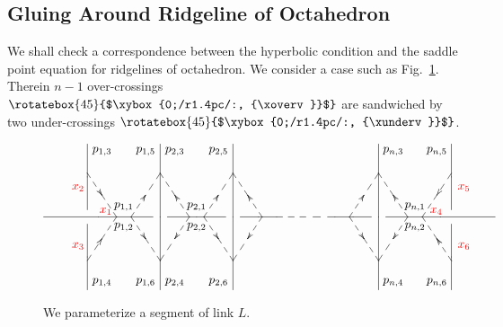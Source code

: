 \documentclass[12pt]{article}
\numberwithin{equation}{section}
\begin{document}
\subsection{Gluing Around Ridgeline of Octahedron}

We shall check  a correspondence between the hyperbolic condition and the
saddle point equation for ridgelines of octahedron.
We consider a case such as Fig.~\ref{fig:Ridge_condition}.
Therein
$n-1$ over-crossings $\text{\rotatebox{45}{$\xybox{0;/r1.4pc/:, {\xoverv}}$}}$
are  sandwiched by two under-crossings
$\text{\rotatebox{45}{$\xybox{0;/r1.4pc/:, {\xunderv}}$}}$.

\begin{figure}[htbp]
  \begin{equation*}
    \xy/r1pc/:.
    {
      {  (2,0) \ar@{-}|@{} (9.5,0) },
      {  (10.5,0) \ar@{-}|@{} (14.5,0) },
      {  (15.5,0) \ar@{-}|@{} (18,0) },
      {  (18,0) \ar@{--}|@{} (22,0) },
      {  (22,0) \ar@{-}|@{} (24.5,0) },
      {  (25.5,0) \ar@{-}|@{} (33,0) },
%
      {  (5,5) \ar@{-}|@{} (5,0.5) },
      {  (5,-0.5) \ar@{-}|@{} (5,-5) },
      {  (30,5) \ar@{-}|@{} (30,0.5) },
      {  (30,-0.5) \ar@{-}|@{} (30,-5) },
%
      {  (10,5) \ar@{-}|@{} (10,-5) },
      {  (15,5) \ar@{-}|@{} (15,-5) },
      {  (25,5) \ar@{-}|@{} (25,-5) },
%
      { (7.5,0.7)*+{p_{1,1}} },
      { (7.5,-0.7)*+{p_{1,2}} },
      { (6,4.5)*+{p_{1,3}} },
      { (6,-4.5)*+{p_{1,4}} },
      { (9,4.5)*+{p_{1,5}} },
      { (9,-4.5)*+{p_{1,6}} },
%
      { (12.5,0.7)*+{p_{2,1}} },
      { (12.5,-0.7)*+{p_{2,2}} },
      { (11,4.5)*+{p_{2,3}} },
      { (11,-4.5)*+{p_{2,4}} },
      { (14,4.5)*+{p_{2,5}} },
      { (14,-4.5)*+{p_{2,6}} },
%
      { (27.5,0.7)*+{p_{n,1}} },
      { (27.5,-0.7)*+{p_{n,2}} },
      { (26,4.5)*+{p_{n,3}} },
      { (26,-4.5)*+{p_{n,4}} },
      { (29,4.5)*+{p_{n,5}} },
      { (29,-4.5)*+{p_{n,6}} },
      { (7, 0) \ar@{--}|@{<} (5,3)  },
      { (7, 0) \ar@{--}|@{<} (5,-3)  },
      { (8, 0) \ar@{--}|@{>} (10,3)  },
      { (8, 0) \ar@{--}|@{>} (10,-3)  },
%
      { (12, 0) \ar@{--}|@{>} (10,3)  },
      { (12, 0) \ar@{--}|@{>} (10,-3)  },
      { (13, 0) \ar@{--}|@{>} (15,3)  },
      { (13, 0) \ar@{--}|@{>} (15,-3)  },
%
      { (17, 0) \ar@{--}|@{>} (15,3)  },
      { (17, 0) \ar@{--}|@{>} (15,-3)  },
%
      { (23, 0) \ar@{--}|@{>} (25,3)  },
      { (23, 0) \ar@{--}|@{>} (25,-3)  },
%
      { (27, 0) \ar@{--}|@{>} (25,3)  },
      { (27, 0) \ar@{--}|@{>} (25,-3)  },
      { (28, 0) \ar@{--}|@{<} (30,3)  },
      { (28, 0) \ar@{--}|@{<} (30,-3)  },
%
      { (6.4,0.4)*+{\text{\textcolor{red}{$x_1$} }} },
      { (4.5,2)*+{\text{\textcolor{red}{$x_2$} }} },
      { (4.5,-2)*+{\text{\textcolor{red}{$x_3$} }} },
%
      { (29.1,0.4)*+{\text{\textcolor{red}{$x_4$} }} },
      { (31,2)*+{\text{\textcolor{red}{$x_5$} }} },
      { (31,-2)*+{\text{\textcolor{red}{$x_6$} }} },
%
      }
    \endxy
  \end{equation*}
  \caption{We parameterize a segment of link $L$.}
  \label{fig:Ridge_condition}
\end{figure}
\end{document}
